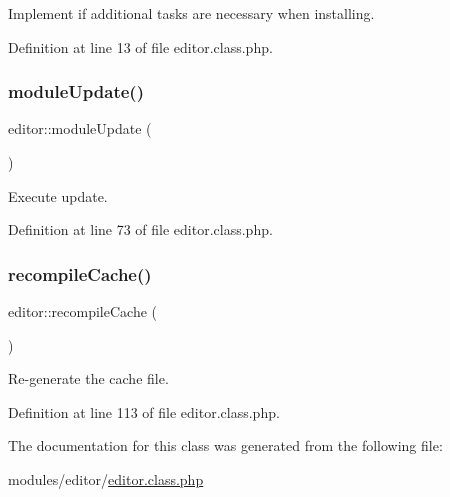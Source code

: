 Implement if additional tasks are necessary when installing. 



Definition at line 13 of file editor.\+class.\+php.

\hypertarget{classeditor_a34fed67c964b594c9f30d52c3da5978c}{}\label{classeditor_a34fed67c964b594c9f30d52c3da5978c} 
\subsubsection{\texorpdfstring{module\+Update()}{moduleUpdate()}}
{\footnotesize\ttfamily editor\+::module\+Update (\begin{DoxyParamCaption}{ }\end{DoxyParamCaption})}



Execute update. 



Definition at line 73 of file editor.\+class.\+php.

\hypertarget{classeditor_a0d96c544cee01a5c733a7c0b7def14e2}{}\label{classeditor_a0d96c544cee01a5c733a7c0b7def14e2} 
\subsubsection{\texorpdfstring{recompile\+Cache()}{recompileCache()}}
{\footnotesize\ttfamily editor\+::recompile\+Cache (\begin{DoxyParamCaption}{ }\end{DoxyParamCaption})}



Re-\/generate the cache file. 



Definition at line 113 of file editor.\+class.\+php.



The documentation for this class was generated from the following file\+:\begin{DoxyCompactItemize}
\item 
modules/editor/\hyperlink{editor_8class_8php}{editor.\+class.\+php}\end{DoxyCompactItemize}
